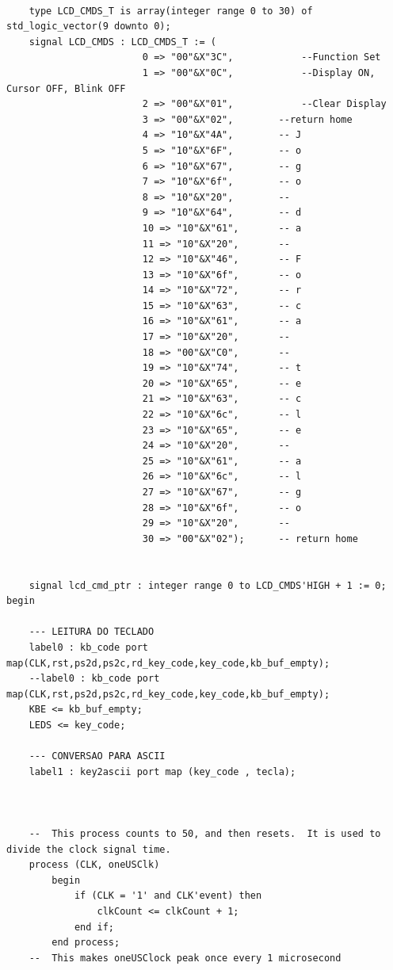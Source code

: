 \documentclass[a4paper,12pt,twoside]{article}
\begin{document}
\begin{lstlisting}
						 
    type LCD_CMDS_T is array(integer range 0 to 30) of std_logic_vector(9 downto 0);
    signal LCD_CMDS : LCD_CMDS_T := ( 
                        0 => "00"&X"3C",            --Function Set
                        1 => "00"&X"0C",			--Display ON, Cursor OFF, Blink OFF
                        2 => "00"&X"01",			--Clear Display
                        3 => "00"&X"02", 		--return home
                        4 => "10"&X"4A", 		-- J
                        5 => "10"&X"6F",  		-- o
                        6 => "10"&X"67",  		-- g
                        7 => "10"&X"6f", 		-- o
                        8 => "10"&X"20", 		-- 
                        9 => "10"&X"64",  		-- d
                        10 => "10"&X"61", 		-- a
                        11 => "10"&X"20", 		--
                        12 => "10"&X"46", 		-- F
                        13 => "10"&X"6f", 		-- o		
                        14 => "10"&X"72",		-- r
                        15 => "10"&X"63", 		-- c
                        16 => "10"&X"61", 		-- a
                        17 => "10"&X"20",		-- 
                        18 => "00"&X"C0",		-- 
                        19 => "10"&X"74",		-- t 
                        20 => "10"&X"65",		-- e
                        21 => "10"&X"63",		-- c
                        22 => "10"&X"6c",		-- l
                        23 => "10"&X"65",		-- e
                        24 => "10"&X"20",		-- 
                        25 => "10"&X"61",		-- a
                        26 => "10"&X"6c",		-- l
                        27 => "10"&X"67",		-- g
                        28 => "10"&X"6f",		-- o
                        29 => "10"&X"20",		-- 
                        30 => "00"&X"02");		-- return home

													
    signal lcd_cmd_ptr : integer range 0 to LCD_CMDS'HIGH + 1 := 0;
begin
	
	--- LEITURA DO TECLADO
    label0 : kb_code port map(CLK,rst,ps2d,ps2c,rd_key_code,key_code,kb_buf_empty);
	--label0 : kb_code port map(CLK,rst,ps2d,ps2c,rd_key_code,key_code,kb_buf_empty);
    KBE <= kb_buf_empty;
    LEDS <= key_code;
	
	--- CONVERSAO PARA ASCII
    label1 : key2ascii port map (key_code , tecla);
	
	

	--  This process counts to 50, and then resets.  It is used to divide the clock signal time.
    process (CLK, oneUSClk)
        begin
            if (CLK = '1' and CLK'event) then
				clkCount <= clkCount + 1;
            end if;
        end process;
	--  This makes oneUSClock peak once every 1 microsecond


\end{lstlisting}
\end{document}
